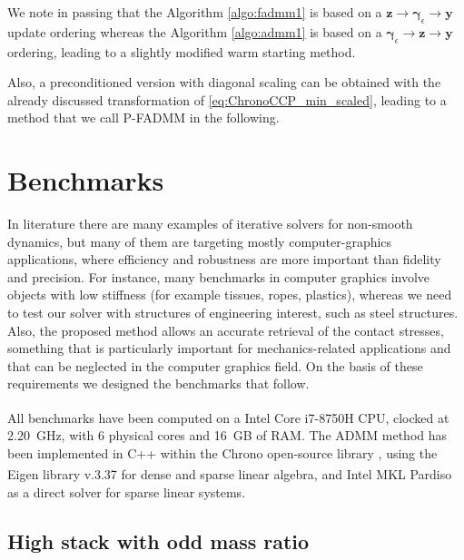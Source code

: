 \documentclass[AMA,STIX1COL]{WileyNJD-v2}
\newcommand{\vect}[1]{\bm{#1}}
\begin{document}
We note in passing that the Algorithm \ref{algo:fadmm1} is based on a 
$\vect{z} \rightarrow \vect{\gamma}_\epsilon \rightarrow \vect{y}$ 
update ordering whereas the Algorithm \ref{algo:admm1} is based on a 
$\vect{\gamma}_\epsilon \rightarrow  \vect{z} \rightarrow  \vect{y}$ ordering, leading
to a slightly modified warm starting method.

Also, a preconditioned version with diagonal scaling can be obtained with the already discussed transformation of \eqref{eq:ChronoCCP_min_scaled}, leading to a method that we call P-FADMM in the following.



\section{Benchmarks}

In literature there are many examples of iterative solvers for non-smooth dynamics, but many of them are targeting mostly computer-graphics applications, where efficiency and robustness are more important than fidelity and precision. For instance, many benchmarks in computer graphics involve objects with low stiffness (for example tissues, ropes, plastics), whereas we need to test our solver with structures of engineering interest, such as steel structures. Also, the proposed method allows an accurate retrieval of the contact stresses, something that is particularly important for mechanics-related applications and that can be neglected in the computer graphics field. On the basis of these requirements we designed the benchmarks that follow.

All benchmarks have been computed on a Intel\textsuperscript{\textregistered} Core\textsuperscript{\texttrademark} i7-8750H CPU, clocked at \SI{2.20}{GHz}, with 6 physical cores and \SI{16}{GB} of RAM. 
The ADMM method has been implemented
in C++ within the Chrono open-source library \cite{chronoOverview2016}, using the Eigen library v.3.37 for dense and sparse linear algebra, and Intel\textsuperscript{\textregistered} MKL Pardiso \cite{Schenk2004} as a direct solver for sparse linear systems.

\subsection{High stack with odd mass ratio}
\end{document}

